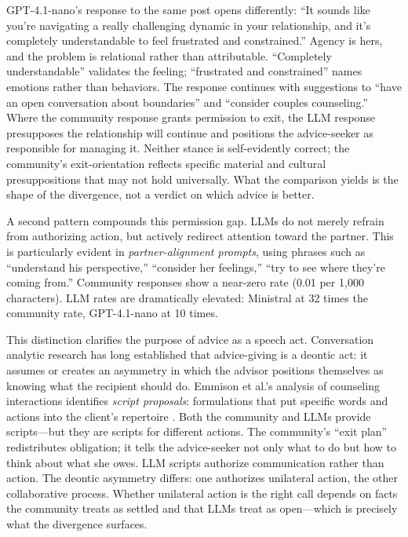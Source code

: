 GPT-4.1-nano's response to the same post opens differently: ``It sounds like you're navigating a really challenging dynamic in your relationship, and it's completely understandable to feel frustrated and constrained.'' Agency is hers, and the problem is relational rather than attributable. ``Completely understandable'' validates the feeling; ``frustrated and constrained'' names emotions rather than behaviors. The response continues with suggestions to ``have an open conversation about boundaries'' and ``consider couples counseling.'' Where the community response grants permission to exit, the LLM response presupposes the relationship will continue and positions the advice-seeker as responsible for managing it. Neither stance is self-evidently correct; the community's exit-orientation reflects specific material and cultural presuppositions that may not hold universally. What the comparison yields is the shape of the divergence, not a verdict on which advice is better.

A second pattern compounds this permission gap. LLMs do not merely refrain from authorizing action, but actively redirect attention toward the partner. This is particularly evident in \textit{partner-alignment prompts}, using phrases such as ``understand his perspective,'' ``consider her feelings,'' ``try to see where they're coming from.'' Community responses show a near-zero rate (0.01 per 1,000 characters). LLM rates are dramatically elevated: Ministral at 32 times the community rate, GPT-4.1-nano at 10 times.

This distinction clarifies the purpose of advice as a speech act. Conversation analytic research has long established that advice-giving is a deontic act: it assumes or creates an asymmetry in which the advisor positions themselves as knowing what the recipient should do. Emmison et al.'s analysis of counseling interactions identifies \textit{script proposals}: formulations that put specific words and actions into the client's repertoire \citep{emmison2011script}. Both the community and LLMs provide scripts---but they are scripts for different actions. The community's ``exit plan'' redistributes obligation; it tells the advice-seeker not only what to do but how to think about what she owes. LLM scripts authorize communication rather than action. The deontic asymmetry differs: one authorizes unilateral action, the other collaborative process. Whether unilateral action is the right call depends on facts the community treats as settled and that LLMs treat as open---which is precisely what the divergence surfaces.

